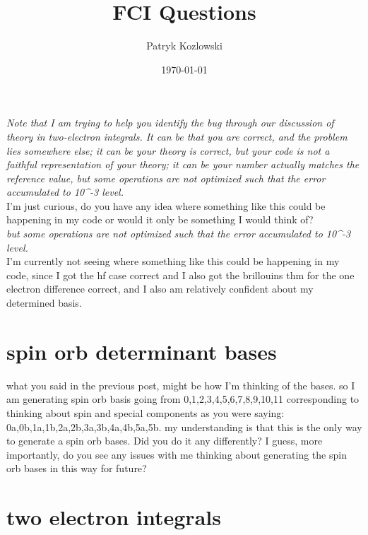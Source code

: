 \documentclass[12pt]{article}
\title{FCI Questions}
\author{Patryk Kozlowski}
\date{\today}
\begin{document}
\maketitle
\emph{Note that I am trying to help you identify the bug through our discussion of theory in two-electron integrals. It can be that you are correct, and the problem lies somewhere else; it can be your theory is correct, but your code is not a faithful representation of your theory; it can be your number actually matches the reference value, but some operations are not optimized such that the error accumulated to 10^-3 level.}
\\I'm just curious, do you have any idea where something like this could be happening in my code or would it only be something I would think of?\\
\emph{but some operations are not optimized such that the error accumulated to 10^-3 level.}\\
 I'm currently not seeing where something like this could be happening in my code, since I got the hf case correct and I also got the brillouins thm for the one electron difference correct, and I also am relatively confident about my determined basis.
\section{spin orb determinant bases}
what you said in the previous post, might be how I'm thinking of the bases. so I am generating spin orb basis going from 0,1,2,3,4,5,6,7,8,9,10,11 corresponding to thinking about spin and special components as you were saying: 0a,0b,1a,1b,2a,2b,3a,3b,4a,4b,5a,5b. my understanding is that this is the only way to generate a spin orb bases. Did you do it any differently? I guess, more importantly, do you see any issues with me thinking about generating the spin orb bases in this way for future?
\section{two electron integrals}

 
\end{document}
